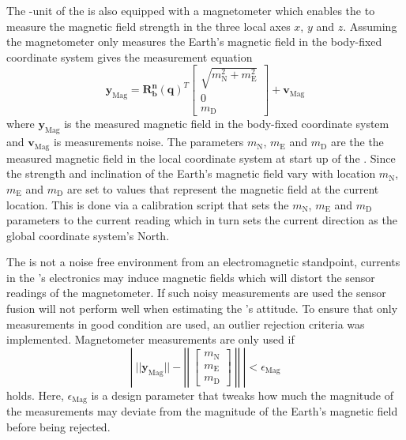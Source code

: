 The \abbrIO-unit of the \abbrROV is also equipped with a magnetometer which enables the \abbrROV to measure the magnetic field strength in the three local axes $x$, $y$ and $z$. Assuming the magnetometer only measures the Earth's magnetic field in the body-fixed coordinate system gives the measurement equation 
\begin{equation}
\boldsymbol{y}_{\text{Mag}} = 
    \boldsymbol{R^n_b}(\boldsymbol{q})^T
    \begin{bmatrix}
        \sqrt{m_\text{N}^2 +m_\text{E}^2}\\
        0\\
        m_\text{D}
    \end{bmatrix}
    + \boldsymbol{v}_{\text{Mag}}
\end{equation}
where $\boldsymbol{y}_{\text{Mag}}$ is the measured magnetic field in the body-fixed coordinate system and $\boldsymbol{v}_{\text{Mag}}$ is measurements noise. The parameters $m_\text{N}$, $m_\text{E}$ and $m_\text{D}$ are the the measured magnetic field in the local coordinate system at start up of the \abbrROV. Since the strength and inclination of the Earth's magnetic field vary with location $m_\text{N}$, $m_\text{E}$ and $m_\text{D}$ are set to values that represent the magnetic field at the current location. This is done via a calibration script that sets the $m_\text{N}$, $m_\text{E}$ and $m_\text{D}$ parameters to the current reading which in turn sets the current direction as the global coordinate system's North.

The \abbrROV is not a noise free environment from an electromagnetic standpoint, currents in the \abbrROV's electronics may induce magnetic fields which will distort the sensor readings of the magnetometer. If such noisy measurements are used the sensor fusion will not perform well when estimating the \abbrROV's attitude. To ensure that only measurements in good condition are used, an outlier rejection criteria was implemented. Magnetometer measurements are only used if 
\begin{equation}
        \left|~||
\boldsymbol{y}_{\text{Mag}}||
    -
    \left|\left|~
    \begin{bmatrix}
        m_\text{N}\\
        m_\text{E}\\
        m_\text{D}
    \end{bmatrix}~\right|\right|
     ~\right| < \epsilon_{\text{Mag}}
\end{equation}
holds. Here, $\epsilon_{\text{Mag}}$ is a design parameter that tweaks how much the magnitude of the measurements may deviate from the magnitude of the Earth's magnetic field before being rejected.

